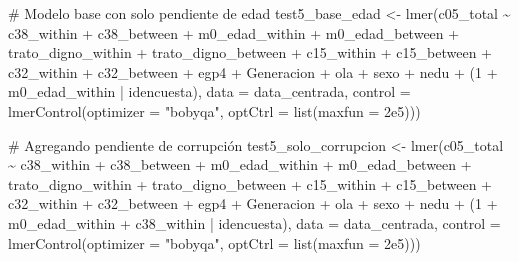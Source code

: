 \documentclass[
  spanish,
  a4paper,
  oneside]{scrbook}
\newenvironment{Shaded}{\begin{snugshade}}{\end{snugshade}}
\newcommand{\AttributeTok}[1]{\textcolor[rgb]{0.40,0.45,0.13}{#1}}
\newcommand{\CommentTok}[1]{\textcolor[rgb]{0.37,0.37,0.37}{#1}}
\newcommand{\DecValTok}[1]{\textcolor[rgb]{0.68,0.00,0.00}{#1}}
\newcommand{\FloatTok}[1]{\textcolor[rgb]{0.68,0.00,0.00}{#1}}
\newcommand{\FunctionTok}[1]{\textcolor[rgb]{0.28,0.35,0.67}{#1}}
\newcommand{\NormalTok}[1]{\textcolor[rgb]{0.00,0.23,0.31}{#1}}
\newcommand{\OtherTok}[1]{\textcolor[rgb]{0.00,0.23,0.31}{#1}}
\newcommand{\SpecialCharTok}[1]{\textcolor[rgb]{0.37,0.37,0.37}{#1}}
\newcommand{\StringTok}[1]{\textcolor[rgb]{0.13,0.47,0.30}{#1}}
\begin{document}
\begin{Shaded}
\begin{Highlighting}[]
\CommentTok{\# Modelo base con solo pendiente de edad}
\NormalTok{test5\_base\_edad }\OtherTok{\textless{}{-}} \FunctionTok{lmer}\NormalTok{(c05\_total }\SpecialCharTok{\textasciitilde{}} 
\NormalTok{                          c38\_within }\SpecialCharTok{+}\NormalTok{ c38\_between }\SpecialCharTok{+}
\NormalTok{                          m0\_edad\_within }\SpecialCharTok{+}\NormalTok{ m0\_edad\_between }\SpecialCharTok{+}
\NormalTok{                          trato\_digno\_within }\SpecialCharTok{+}\NormalTok{ trato\_digno\_between }\SpecialCharTok{+}
\NormalTok{                          c15\_within }\SpecialCharTok{+}\NormalTok{ c15\_between }\SpecialCharTok{+}
\NormalTok{                          c32\_within }\SpecialCharTok{+}\NormalTok{ c32\_between }\SpecialCharTok{+}
\NormalTok{                          egp4 }\SpecialCharTok{+}\NormalTok{ Generacion }\SpecialCharTok{+}\NormalTok{ ola }\SpecialCharTok{+}\NormalTok{ sexo }\SpecialCharTok{+}\NormalTok{ nedu }\SpecialCharTok{+}
\NormalTok{                          (}\DecValTok{1} \SpecialCharTok{+}\NormalTok{ m0\_edad\_within }\SpecialCharTok{|}\NormalTok{ idencuesta),}
                        \AttributeTok{data =}\NormalTok{ data\_centrada,}
                        \AttributeTok{control =} \FunctionTok{lmerControl}\NormalTok{(}\AttributeTok{optimizer =} \StringTok{"bobyqa"}\NormalTok{,}
                                              \AttributeTok{optCtrl =} \FunctionTok{list}\NormalTok{(}\AttributeTok{maxfun =} \FloatTok{2e5}\NormalTok{)))}

\CommentTok{\# Agregando pendiente de corrupción}
\NormalTok{test5\_solo\_corrupcion }\OtherTok{\textless{}{-}} \FunctionTok{lmer}\NormalTok{(c05\_total }\SpecialCharTok{\textasciitilde{}} 
\NormalTok{                                c38\_within }\SpecialCharTok{+}\NormalTok{ c38\_between }\SpecialCharTok{+}
\NormalTok{                                m0\_edad\_within }\SpecialCharTok{+}\NormalTok{ m0\_edad\_between }\SpecialCharTok{+}
\NormalTok{                                trato\_digno\_within }\SpecialCharTok{+}\NormalTok{ trato\_digno\_between }\SpecialCharTok{+}
\NormalTok{                                c15\_within }\SpecialCharTok{+}\NormalTok{ c15\_between }\SpecialCharTok{+}
\NormalTok{                                c32\_within }\SpecialCharTok{+}\NormalTok{ c32\_between }\SpecialCharTok{+}
\NormalTok{                                egp4 }\SpecialCharTok{+}\NormalTok{ Generacion }\SpecialCharTok{+}\NormalTok{ ola }\SpecialCharTok{+}\NormalTok{ sexo }\SpecialCharTok{+}\NormalTok{ nedu }\SpecialCharTok{+}
\NormalTok{                                (}\DecValTok{1} \SpecialCharTok{+}\NormalTok{ m0\_edad\_within }\SpecialCharTok{+}\NormalTok{ c38\_within }\SpecialCharTok{|}\NormalTok{ idencuesta),}
                              \AttributeTok{data =}\NormalTok{ data\_centrada,}
                              \AttributeTok{control =} \FunctionTok{lmerControl}\NormalTok{(}\AttributeTok{optimizer =} \StringTok{"bobyqa"}\NormalTok{,}
                                                    \AttributeTok{optCtrl =} \FunctionTok{list}\NormalTok{(}\AttributeTok{maxfun =} \FloatTok{2e5}\NormalTok{)))}


\end{Highlighting}
\end{Shaded}
\end{document}
